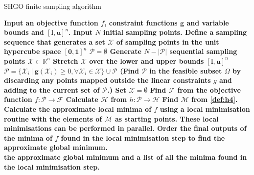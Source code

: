 \begin{algorithm} 
\caption{SHGO finite sampling algorithm}
\label{alg:shgo1}
\begin{algorithmic}[1]
\State \bf{Input} \normalfont an objective function $f$, constraint functions $\mathbf{g}$ and variable bounds and $[\mathbf{l}, \mathbf{u}]^n$.
\State \bf{Input} \normalfont $N$ initial sampling points.
\State Define a sampling sequence that generates a set $\mathcal{X}$ of sampling points in the unit hypercube space $[\mathbf{0}, \mathbf{1}]^n$
\EndProcedure
{}
\State $\mathcal{P} = \emptyset$
\State Generate $N - |\mathcal{P}|$ sequential sampling points $\mathcal{X} \subset \mathbb{R}^n$
\State Stretch $\mathcal{X}$ over the lower and upper bounds $[\mathbf{l}, \mathbf{u}]^n$
\State  $\mathcal{P} = \{\mathcal{X}_i ~|~ \mathbf{g}(\mathcal{X}_i) \geq 0, \forall \mathcal{X}_i \in \mathcal{X}\} \cup\mathcal{P}$ 
\Comment (Find $\mathcal{P}$ in the feasible subset $\Omega$ by discarding any points mapped outside the linear constraints $g$ and adding to the current set of $\mathcal{P}$.)
\State Set $\mathcal{X} = \emptyset$
\EndWhile
\State Find $\mathcal{F}$ from the objective function $f: \mathcal{P} \rightarrow \mathcal{F}$
\EndProcedure
{}
\State Calculate $\mathcal{H}$ from $h: \mathcal{P}\rightarrow \mathcal{H}$
\EndProcedure
{}
\State Find $\mathcal{M}$ from \autoref{def:h4}.
\EndProcedure
{}
\State Calculate the approximate local minima of $f$ using a local minimisation routine with the elements of $\mathcal{M}$ as starting points.
\Comment These local minimisations can be performed in parallel.
\EndProcedure
{}
\State Order the final outputs of the minima of $f$ found in the local minimisation step to find the approximate global minimum.
\EndProcedure \\
\Return the approximate global minimum and a list of all the minima found in the local minimisation step.
\end{algorithmic}
\end{algorithm} 





